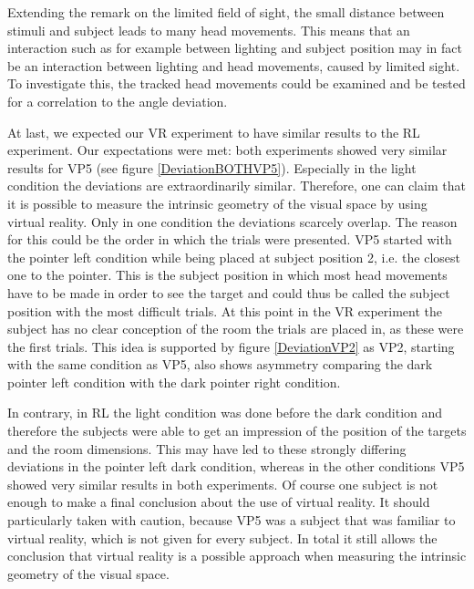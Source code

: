 Extending the remark on the limited field of sight, the small distance between stimuli and subject leads to many head movements. This means that an interaction such as for example between lighting and subject position may in fact be an interaction between lighting and head movements, caused by limited sight. To investigate this, the tracked head movements could be examined and be tested for a correlation to the angle deviation. 

At last, we expected our VR experiment to have similar results to the RL experiment. Our expectations were met: both experiments showed very similar results for VP5 (see figure \ref{DeviationBOTHVP5}). Especially in the light condition the deviations are extraordinarily similar. Therefore, one can claim that it is possible to measure the intrinsic geometry of the visual space by using virtual reality. Only in one condition the deviations scarcely overlap. The reason for this could be the order in which the trials were presented. VP5 started with the pointer left condition while being placed at subject position 2, i.e. the closest one to the pointer. This is the subject position in which most head movements have to be made in order to see the target and could thus be called the subject position with the most difficult trials. At this point in the VR experiment the subject has no clear conception of the room the trials are placed in, as these were the first trials. This idea is supported by figure \ref{DeviationVP2} as VP2, starting with the same condition as VP5, also shows asymmetry comparing the dark pointer left condition with the dark pointer right condition. 

In contrary, in RL the light condition was done before the dark condition and therefore the subjects were able to get an impression of the position of the targets and the room dimensions.
This may have led to these strongly differing deviations in the pointer left dark condition, whereas in the other conditions VP5 showed very similar results in both experiments. Of course one subject is not enough to make a final conclusion about the use of virtual reality. It should particularly taken with caution, because VP5 was a subject that was familiar to virtual reality, which is not given for every subject. In total it still allows the conclusion that virtual reality is a possible approach when measuring the intrinsic geometry of the visual space. 

